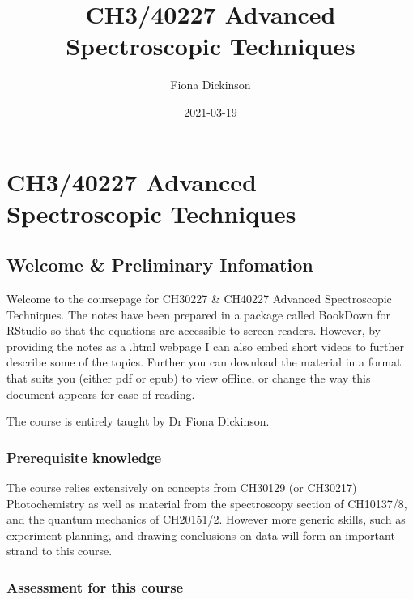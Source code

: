 \documentclass[
]{book}
\title{CH3/40227 Advanced Spectroscopic Techniques}
\author{Fiona Dickinson}
\date{2021-03-19}
\begin{document}
\maketitle

{
\setcounter{tocdepth}{1}
\tableofcontents
}
\hypertarget{ch340227-advanced-spectroscopic-techniques}{%
\chapter*{CH3/40227 Advanced Spectroscopic Techniques}\label{ch340227-advanced-spectroscopic-techniques}}

\hypertarget{welcome-preliminary-infomation}{%
\section*{Welcome \& Preliminary Infomation}\label{welcome-preliminary-infomation}}

Welcome to the coursepage for CH30227 \& CH40227 Advanced Spectroscopic Techniques. The notes have been prepared in a package called BookDown for RStudio so that the equations are accessible to screen readers. However, by providing the notes as a .html webpage I can also embed short videos to further describe some of the topics. Further you can download the material in a format that suits you (either pdf or epub) to view offline, or change the way this document appears for ease of reading.

The course is entirely taught by Dr Fiona Dickinson.

\hypertarget{prerequisite-knowledge}{%
\subsection*{Prerequisite knowledge}\label{prerequisite-knowledge}}

The course relies extensively on concepts from CH30129 (or CH30217) Photochemistry as well as material from the spectroscopy section of CH10137/8, and the quantum mechanics of CH20151/2. However more generic skills, such as experiment planning, and drawing conclusions on data will form an important strand to this course.

\hypertarget{assessment-for-this-course}{%
\subsection*{Assessment for this course}\label{assessment-for-this-course}}
\end{document}
